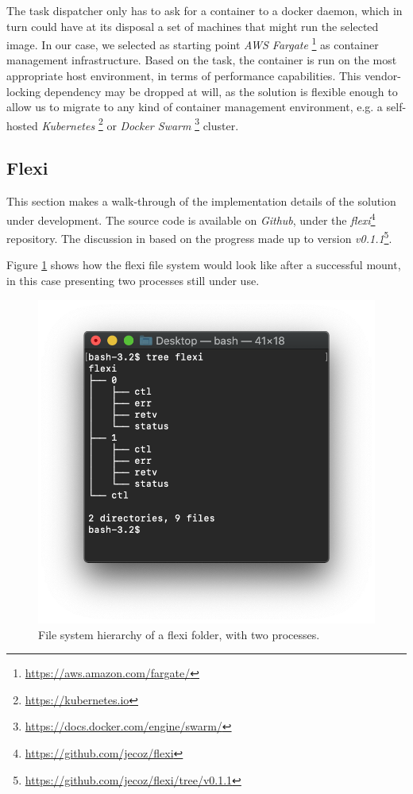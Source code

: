 \documentclass{article}
\begin{document}
The task dispatcher only has to ask for a container to a docker daemon, which in turn could have at its disposal a set of machines that might run the selected image. In our case, we selected as starting point \textit{AWS Fargate} \footnote{\url{https://aws.amazon.com/fargate/}} as container management infrastructure. Based on the task, the container is run on the most appropriate host environment, in terms of performance capabilities. This vendor-locking dependency may be dropped at will, as the solution is flexible enough to allow us to migrate to any kind of container management environment, e.g. a self-hosted \textit{Kubernetes} \footnote{\url{https://kubernetes.io}} or \textit{Docker Swarm} \footnote{\url{https://docs.docker.com/engine/swarm/}} cluster.

\subsection{Flexi}
This section makes a walk-through of the implementation details of the solution under development. The source code is available on \textit{Github}, under the \textit{flexi}\footnote{\url{https://github.com/jecoz/flexi}} repository. The discussion in based on the progress made up to version \textit{v0.1.1}\footnote{\url{https://github.com/jecoz/flexi/tree/v0.1.1}}.

Figure \ref{fig:fsh} shows how the flexi file system would look like after a successful mount, in this case presenting two processes still under use.
\begin{figure}[h]
    \centering
    \includegraphics[width=.7\textwidth]{flexi-tree.fake.1.png}
    \caption{File system hierarchy of a flexi folder, with two processes.}
    \label{fig:fsh}
\end{figure}
\end{document}
